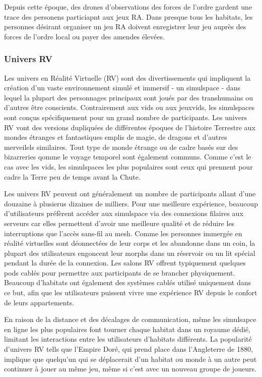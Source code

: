 Depuis cette époque, des drones d'observations des forces de l'ordre gardent une trace des personens particiapnt aux jeux RA. Dans presque tous les habitats, les personnes désirant organiser un jeu RA doivent enregistrer leur jeu auprès des forces de l'ordre local ou payer des amendes élevées. 

\subsubsection{Univers RV} \label{sec:vr-worlds} 

Les univers en Réalité Virtuelle (RV) sont des divertissements qui impliquent la création d'un vaste environnement simulé et immersif - un simulspace - dans lequel la plupart des personnages principaux sont joués par des transhumains ou d'autres être conscients. Contrairement aux vids ou aux jeuxvids, les simulspaces sont conçus spécifiquement pour un grand nombre de participants. Les univers RV vont des versions dupliquées de différentes époques de l'histoire Terrestre aux mondes étranges et fantastiques emplis de magie, de dragons et d'autres merveilels similaires. Tout type de monde étrange ou de cadre basés sur des bizarreries qomme le voyage temporel sont également communs. Comme c'est le cas avec les vids, les simulspaces les plus populaires sont ceux qui prennent pour cadre la Terre peu de temps avant la Chute. 

Les univers RV peuvent ont généralement un nombre de participants allant d'une douzaine à plusierus dizaines de milliers. Pour une meilleure expérience, beaucoup d'utilisateurs préfèrent accéder aux simulspace via des connexions filaires aux serveurs car elles permettent d'avoir une meilleure qualité et de réduire les interruptions que l'accès sans-fil au mesh. Comme les personnes immergée en réalité virtuelles sont déonnectées de leur corps et les abandonne dans un coin, la plupart des utilisateurs engoncent leur morphs dans un réservoir ou un lit spécial pendant la durée de la connexion. Les salons RV offrent typiquement quelques pods cablés pour permettre aux participants de se brancher physiquement. Beaucoup d'habitats ont également des systèmes cablés utilisé uniquement dans ce but, afin que les utilisateurs puissent vivre une expérience RV depuis le confort de leurs appartements. 

En raison de la distance et des décalages de communication, même les simulsapce en ligne les plus populaires font tourner chaque habitat dans un royaume dédié, limitant les interactions entre les utilisateurs d'habitats différents. La popularité d'univers RV tells que l'Empire Doré, qui prend place dans l'Angleterre de 1880, implique que quelqu'un qui se déplacerait d'un habitat ou monde à un autre peut continuer à jouer au même jeu, même si c'est avec un nouveau groupe de joueurs. 

